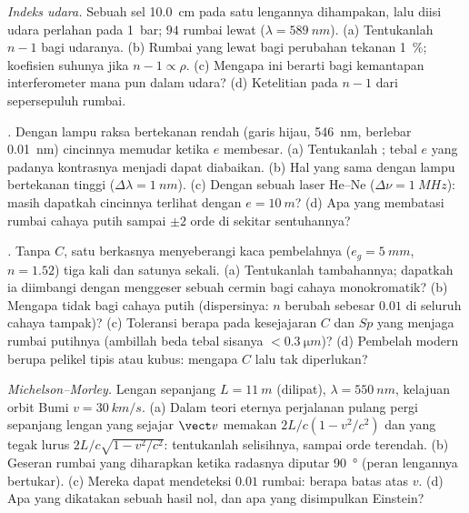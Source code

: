 \begin{exercise}[$\star\star$]\label{exo:b2:michelson:6}
\emph{Indeks udara.} Sebuah sel \qty{10.0}{cm} pada satu lengannya dihampakan, lalu
diisi udara perlahan pada \qty{1}{bar}; $94$ rumbai lewat ($\lambda = \qty{589}{nm}$).
(a) Tentukanlah $n - 1$ bagi udaranya. (b) Rumbai yang lewat bagi perubahan tekanan \qty{1}{\%};
koefisien suhunya jika $n - 1 \propto \rho$. (c) Mengapa ini
berarti bagi kemantapan interferometer mana pun dalam udara? (d) Ketelitian pada
$n - 1$ dari sepersepuluh rumbai.
\end{exercise}

\begin{exercise}[$\star\star$]\label{exo:b2:michelson:7}
\emph{.} Dengan lampu raksa bertekanan rendah (garis hijau,
\qty{546}{nm}, berlebar \qty{0.01}{nm}) cincinnya memudar ketika $e$ membesar. (a) Tentukanlah ; tebal $e$ yang padanya kontrasnya menjadi dapat diabaikan. (b) Hal yang sama
dengan lampu bertekanan tinggi ($\Delta\lambda = \qty{1}{nm}$). (c) Dengan sebuah laser He--Ne
($\Delta\nu = \qty{1}{MHz}$): masih dapatkah cincinnya terlihat dengan $e = \qty{10}{m}$? (d) Apa
yang membatasi rumbai cahaya putih sampai $\pm2$ orde di sekitar sentuhannya?
\end{exercise}

\begin{exercise}[$\star\star$]\label{exo:b2:michelson:8}
\emph{.} Tanpa $C$, satu berkasnya menyeberangi kaca
pembelahnya ($e_g = \qty{5}{mm}$, $n = 1.52$) tiga kali dan satunya sekali. (a)
Tentukanlah  tambahannya; dapatkah ia diimbangi dengan menggeser sebuah cermin bagi
cahaya monokromatik? (b) Mengapa tidak bagi cahaya putih (dispersinya: $n$
berubah sebesar $0.01$ di seluruh cahaya tampak)? (c) Toleransi berapa pada
kesejajaran $C$ dan $Sp$ yang menjaga rumbai putihnya (ambillah beda tebal
sisanya $< \qty{0.3}{\micro m}$)? (d) Pembelah modern berupa
pelikel tipis atau kubus: mengapa $C$ lalu tak diperlukan?
\end{exercise}

\begin{exercise}[$\star\star$]\label{exo:b2:michelson:9}
\emph{Michelson--Morley.} Lengan sepanjang $L = \qty{11}{m}$ (dilipat), $\lambda = \qty{550}{nm}$,
kelajuan orbit Bumi $v = \qty{30}{km/s}$. (a) Dalam teori eternya perjalanan
pulang pergi sepanjang lengan yang sejajar $\vect v$ memakan $2L/c(1 - v^2/c^2)$
dan yang tegak lurus $2L/c\sqrt{1 - v^2/c^2}$: tentukanlah selisihnya, sampai orde
terendah. (b) Geseran rumbai yang diharapkan ketika radasnya diputar \qty{90}{\degree}
(peran lengannya bertukar). (c) Mereka dapat mendeteksi $0.01$ rumbai: berapa batas
atas $v$. (d) Apa yang dikatakan sebuah hasil nol, dan apa yang disimpulkan Einstein?
\end{exercise}

